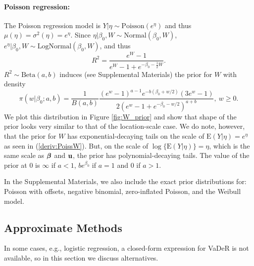 \documentclass[12pt]{article}
\begin{document}
\paragraph{Poisson regression:}
The Poisson regression model is $Y|\eta \sim\mbox{Poisson}(e^\eta)$ and thus $\mu(\eta)=\sigma^2(\eta)=e^\eta$.  Since $\eta|\beta_0,W\sim\mbox{Normal}(\beta_0,W)$, $e^\eta|\beta_0,W\sim\mbox{LogNormal}(\beta_0,W)$, and thus
\begin{equation}\label{e:PoissonR2}
    R^2
    =\frac{e^{W}-1}{e^{W}-1+e^{-\beta_0-\frac12W}}.
\end{equation}
$R^2\sim\mbox{Beta}(a,b)$ induces (see Supplemental Materials) the prior for $W$ with density
\begin{equation}\label{deriv:PoissW}
    \pi(w| \beta_0;a,b)
    =\frac{1}{B(a,b)} \frac{(e^{w}-1)^{a-1} e^{-b(\beta_0+w/2)}(3e^{w}-1)}{2(e^{w}-1+e^{-\beta_0-w/2})^{a+b}},\ w\geq0.
\end{equation}
We plot this distribution in Figure \ref{fig:W_prior}
and show that shape of the prior looks very similar to that of the location-scale case. We do note, however, that the prior for $W$ has exponential-decaying tails on the scale of $\mbox{E}(Y|\eta)=e^\eta$ as seen in (\ref{deriv:PoissW}). But, on the scale of $\log\{\mbox{E}(Y|\eta)\}=\eta$, which is the same scale as $\mbox{\boldmath $\beta$}$ and $\mbox{\bf u}$, the prior has polynomial-decaying tails. The value of the prior at 0 is $\infty$ if $a<1$, $be^{\beta_0}$ if $a=1$ and $0$ if $a>1$.

In the Supplemental Materials, we also include the exact prior distributions for: Poisson with offsets, negative binomial, zero-inflated Poisson, and the Weibull model.

\subsection{Approximate Methods}
In some cases, e.g., logistic regression, a closed-form expression for VaDeR is not available, so in this section we discuss alternatives.
\end{document}
